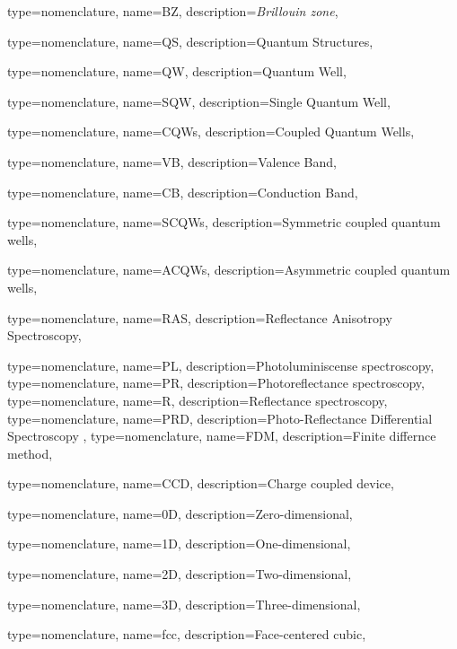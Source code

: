 {type={nomenclature},
name={BZ},
description={\emph{Brillouin zone}},
}

{type={nomenclature},
name={QS},
description={Quantum Structures},
}


{type={nomenclature},
name={QW},
description={Quantum Well},
}

{type={nomenclature},
name={SQW},
description={Single Quantum Well},
}

{type={nomenclature},
name={CQWs},
description={Coupled Quantum Wells},
}

{type={nomenclature},
name={VB},
description={Valence Band},
}


{type={nomenclature},
name={CB},
description={Conduction Band},
}

{type={nomenclature},
name={SCQWs},
description={Symmetric coupled quantum wells},
}

{type={nomenclature},
name={ACQWs},
description={Asymmetric coupled quantum wells},
}

{type={nomenclature},
name={RAS},
description={Reflectance Anisotropy Spectroscopy},
}

{type={nomenclature},
name={PL},
description={Photoluminiscense spectroscopy},
}
{type={nomenclature},
name={PR},
description={Photoreflectance spectroscopy},
}
{type={nomenclature},
name={R},
description={Reflectance spectroscopy},
}
{type={nomenclature},
name={PRD},
description={Photo-Reflectance Differential Spectroscopy },
}
{type={nomenclature},
name={FDM},
description={Finite differnce method},
}

{type={nomenclature},
name={CCD},
description={Charge coupled device},
}

{type={nomenclature},
name={0D},
description={Zero-dimensional},
}

{type={nomenclature},
name={1D},
description={One-dimensional},
}

{type={nomenclature},
name={2D},
description={Two-dimensional},
}

{type={nomenclature},
name={3D},
description={Three-dimensional},
}

{type={nomenclature},
name={fcc},
description={Face-centered cubic},
}


